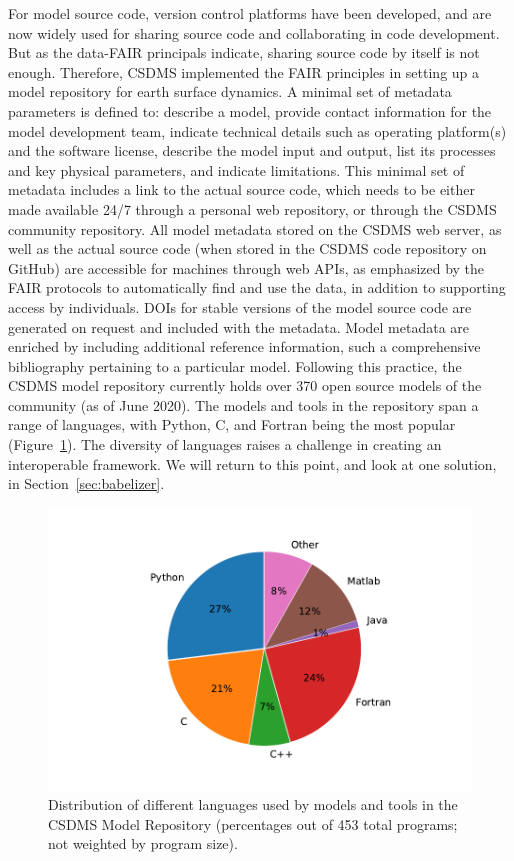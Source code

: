 \documentclass[12pt]{amsart}
\begin{document}
For model source code, version control platforms have been developed, and are now widely used for sharing source code and collaborating in code development. But as the data-FAIR principals indicate, sharing source code by itself is not enough. Therefore, CSDMS implemented the FAIR principles in setting up a model repository for earth surface dynamics. A minimal set of metadata parameters is defined to: describe a model, provide contact information for the model development team, indicate technical details such as operating platform(s) and the software license, describe the model input and output, list its processes and key physical parameters, and indicate limitations. This minimal set of metadata includes a link to the actual source code, which needs to be either made available 24/7 through a personal web repository, or through the CSDMS community repository. All model metadata stored on the CSDMS web server, as well as the actual source code (when stored in the CSDMS code repository on GitHub) are accessible for machines through web APIs, as emphasized by the FAIR protocols to automatically find and use the data, in addition to supporting access by individuals. DOIs for stable versions of the model source code are generated on request and included with the metadata. Model metadata are enriched by including additional reference information, such a comprehensive bibliography pertaining to a particular model. Following this practice, the CSDMS model repository currently holds over 370 open source models of the community (as of June 2020). The models and tools in the repository span a range of languages, with Python, C, and Fortran being the most popular (Figure~\ref{fig:languages}). The diversity of languages raises a challenge in creating an interoperable framework. We will return to this point, and look at one solution, in Section~\ref{sec:babelizer}.

\begin{figure}[h!]
\centering
\includegraphics[scale=0.8]{Figures/languages_in_repository.pdf}
\caption{Distribution of different languages used by models and tools in the CSDMS Model Repository (percentages out of 453 total programs; not weighted by program size).}
\label{fig:languages}
\end{figure}
\end{document}
